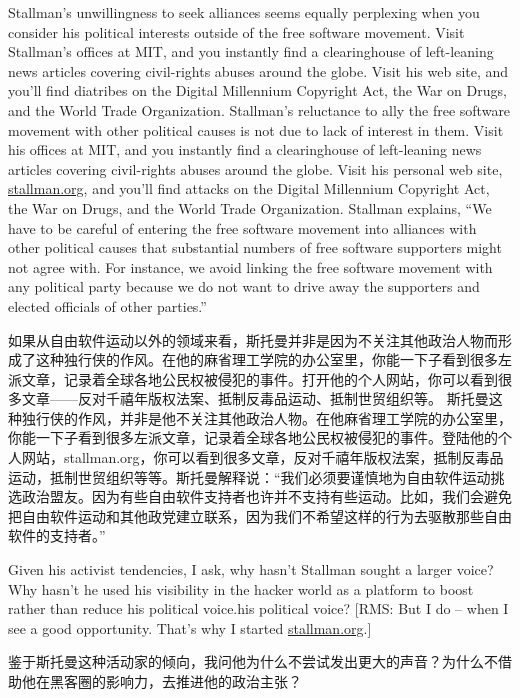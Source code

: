 \ifdefined\eng
\ifdefined\vone
Stallman's unwillingness to seek alliances seems equally perplexing when you consider his political interests outside of the free software movement. Visit Stallman's offices at MIT, and you instantly find a clearinghouse of left-leaning news articles covering civil-rights abuses around the globe. Visit his web site, and you'll find diatribes on the Digital Millennium Copyright Act, the War on Drugs, and the World Trade Organization.
\fi
\ifdefined\vtwo
Stallman's reluctance to ally the free software movement with other political causes is not due to lack of interest in them.  Visit his offices at MIT, and you instantly find a clearinghouse of left-leaning news articles covering civil-rights abuses around the globe. Visit his personal web site, \url{stallman.org}, and you'll find attacks on the Digital Millennium Copyright Act, the War on Drugs, and the World Trade Organization.  Stallman explains, ``We have to be careful of entering the free software movement into alliances with other political causes that substantial numbers of free software supporters might not agree with.  For instance, we avoid linking the free software movement with any political party because we do not want to drive away the supporters and elected officials of other parties.''
\fi
\fi

\ifdefined\chs
\ifdefined\vone
如果从自由软件运动以外的领域来看，斯托曼并非是因为不关注其他政治人物而形成了这种独行侠的作风。在他的麻省理工学院的办公室里，你能一下子看到很多左派文章，记录着全球各地公民权被侵犯的事件。打开他的个人网站，你可以看到很多文章——反对千禧年版权法案、抵制反毒品运动、抵制世贸组织等。
\fi
\ifdefined\vtwo
斯托曼这种独行侠的作风，并非是他不关注其他政治人物。在他麻省理工学院的办公室里，你能一下子看到很多左派文章，记录着全球各地公民权被侵犯的事件。登陆他的个人网站，stallman.org，你可以看到很多文章，反对千禧年版权法案，抵制反毒品运动，抵制世贸组织等等。斯托曼解释说：``我们必须要谨慎地为自由软件运动挑选政治盟友。因为有些自由软件支持者也许并不支持有些运动。比如，我们会避免把自由软件运动和其他政党建立联系，因为我们不希望这样的行为去驱散那些自由软件的支持者。''
\fi
\fi

\ifdefined\eng
Given his activist tendencies, I ask, why hasn't Stallman sought a larger voice? Why hasn't he used his visibility in the hacker world as a platform to boost \ifdefined\vone rather than reduce his political voice.\fi\ifdefined\vtwo his political voice? [RMS: But I do -- when I see a good opportunity.  That's why I started \url{stallman.org}.]\fi
\fi

\ifdefined\chs
鉴于斯托曼这种活动家的倾向，我问他为什么不尝试发出更大的声音？为什么不借助他在黑客圈的影响力，去推进他的政治主张？\ifdefined{} \fi
\fi

